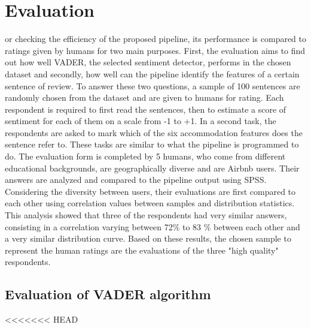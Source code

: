 %
%


\let\textcircled=\pgftextcircled
\chapter{Evaluation}
\label{chap:eva}

or checking the efficiency of the proposed pipeline, its performance is compared to ratings given by humans for two main purposes. First, the evaluation aims to find out how well VADER, the selected sentiment detector, performs in the chosen dataset and secondly, how well can the pipeline identify the features of a certain sentence of review. To answer these two questions, a sample of 100 sentences are randomly chosen from the dataset and are given to humans for rating. Each respondent is required to first read the sentences, then to estimate a score of sentiment for each of them on a scale from -1 to +1. In a second task, the respondents are asked to mark which of the six accommodation features does the sentence refer to. These tasks are similar to what the pipeline is programmed to do. 
The evaluation form is completed by 5 humans, who come from different educational backgrounds, are geographically diverse and are Airbnb users. Their answers are analyzed and compared to the pipeline output using SPSS. Considering the diversity between users, their evaluations are first compared to each other using correlation values between samples and distribution statistics. This analysis showed that three of the respondents had very similar answers, consisting in a correlation varying between 72\% to 83 \% between each other and a very similar distribution curve. 
Based on these results, the chosen sample to represent the human ratings are the evaluations of the three "high quality" respondents.

\section{Evaluation of VADER algorithm}
<<<<<<< HEAD

